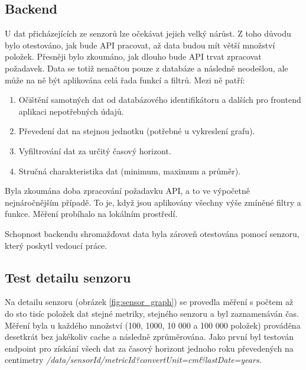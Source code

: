 \documentclass[thesis=M,czech]{FITthesis}[2018/10/20]
\begin{document}
\subsection{Backend}
U dat přicházejících ze senzorů lze očekávat jejich velký nárůst. Z toho důvodu bylo otestováno, jak bude API pracovat, až data budou mít větší množství položek. Přesněji bylo zkoumáno, jak dlouho bude API trvat zpracovat požadavek. Data se totiž nenačtou pouze z databáze a následně neodešlou, ale může na ně být aplikována celá řada funkcí a filtrů. Mezi ně patří:
\begin{enumerate}
\item Očištění samotných dat od databázového identifikátoru a dalších pro frontend aplikaci nepotřebných údajů.
\item Převedení dat na stejnou jednotku (potřebné u vykreslení grafu).
\item Vyfiltrování dat za určitý časový horizont.
\item Stručná charakteristika dat (minimum, maximum a průměr).
\end{enumerate}

Byla zkoumána doba zpracování požadavku API, a to ve výpočetně nejnáročnějším případě. To je, když jsou aplikovány všechny výše zmíněné filtry a funkce. Měření probíhalo na lokálním prostředí.

Schopnost backendu shromažďovat data byla zároveň otestována pomocí senzoru, který poskytl vedoucí práce.
\newpage
\subsection{Test detailu senzoru}

Na detailu senzoru (obrázek \ref{fig:sensor_graph}) se provedla měření s počtem až do sto tisíc položek dat stejné metriky, stejného senzoru a byl zaznamenáván čas. Měření byla u každého množství (100, 1000, 10 000 a 100 000 položek) prováděna desetkrát bez jakékoliv cache a následně zprůměrována. Jako první byl testován endpoint pro získání všech dat za časový horizont jednoho roku převedených na centimetry \textit{/data/sensorId/metricId?convertUnit=cm\&lastDate=years}.

\begin{figure}[h]
\end{figure}
\end{document}
